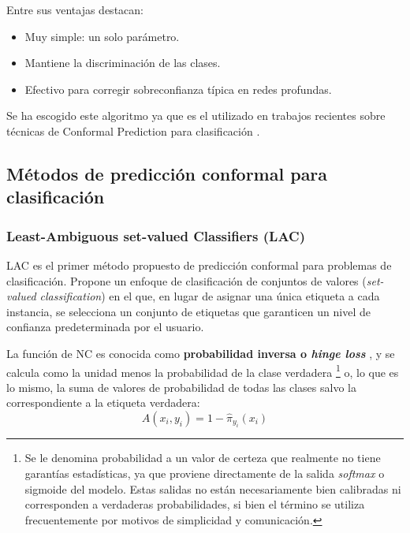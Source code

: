 Entre sus ventajas destacan:
\begin{itemize}
    \item Muy simple: un solo parámetro.
    \item Mantiene la discriminación de las clases.
    \item Efectivo para corregir sobreconfianza típica en redes profundas.
\end{itemize}

Se ha escogido este algoritmo ya que es el utilizado en trabajos recientes sobre técnicas de Conformal Prediction para clasificación \cite{angelopoulos2020, huang2023conformal}.


\subsection{Métodos de predicción conformal para clasificación}

\subsubsection{Least-Ambiguous set-valued Classifiers (LAC)}

\acrshort{LAC} \cite{sadinle2019} es el primer método propuesto de predicción conformal para problemas de clasificación. Propone un enfoque de clasificación de conjuntos de valores (\textit{set-valued classification}) en el que, en lugar de asignar una única etiqueta a cada instancia, se selecciona un conjunto de etiquetas que garanticen un nivel de confianza predeterminada por el usuario.

La función de \acrshort{NC} es conocida como \textbf{probabilidad inversa o \textit{hinge loss}} \cite{johansson2017}, y se calcula como la unidad menos la probabilidad de la clase verdadera%
\footnote{
    Se le denomina probabilidad a un valor de certeza que realmente no tiene garantías estadísticas, ya que proviene directamente de la salida \textit{softmax} o sigmoide del modelo. Estas salidas no están necesariamente bien calibradas ni corresponden a verdaderas probabilidades, si bien el término se utiliza frecuentemente por motivos de simplicidad y comunicación.
}
o, lo que es lo mismo, la suma de valores de probabilidad de todas las clases salvo la correspondiente a la etiqueta verdadera:
$$
A(x_i,y_i) = 1- \hat{\pi}_{y_i}(x_i)
$$


